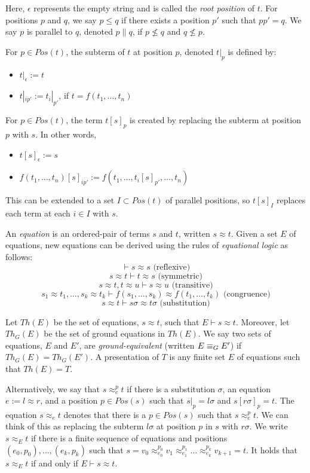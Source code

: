 Here, $\epsilon$ represents the empty string and is called the \emph{root position} of $t$.
For positions $p$ and $q$, we say $p \le q$ if there exists a position $p'$ such that $pp' = q$.  
We say $p$ is parallel to $q$, denoted $p \| q$, if $p \not\le q$ and $q \not\le p$. 

For $p \in Pos(t)$, the subterm of $t$ at position $p$, denoted $t|_p$ is defined by:
\begin{itemize}
\item $t|_\epsilon := t$ 
\item $t|_{ip'} := t_i|_{p'}$, if $t = f(t_1, \dots, t_n)$
\end{itemize}

For $p \in Pos(t)$, the term $t[s]_p$ is created by replacing the subterm at position $p$ with $s$. In other words,
\begin{itemize}
\item $t[s]_\epsilon := s$
\item $f(t_1, \dots, t_n)[s]_{ip'} := f(t_1, \dots, t_i[s]_{p'}, \dots, t_n)$
\end{itemize}

This can be extended to a set $I \subset Pos(t)$ of parallel positions, so $t[s]_I$ replaces each term at each $i \in I$ with $s$.

An \emph{equation} is an ordered-pair of terms $s$ and $t$, written $s \approx t$. 
Given a set $E$ of equations, new equations can be derived using the rules of \emph{equational logic} as follows:
\[ \vdash s \approx s \mbox{ (reflexive)}\]
\[s \approx t \vdash t \approx s \mbox{ (symmetric)}\]
\[s \approx t, t \approx u \vdash s \approx u \mbox{ (transitive)}\]
\[s_1 \approx t_1, \dots, s_k \approx t_k \vdash f(s_1,\dots,s_k)\approx f(t_1,\dots,t_k) \mbox{ (congruence)}\]
\[s \approx t \vdash s\sigma \approx t\sigma \mbox{ (substitution)}\]


Let $Th(E)$ be the set of equations, $s \approx t$, such that $E \vdash s \approx t$. 
Moreover, let $Th_G(E)$ be the set of ground equations in $Th(E)$. 
We say two sets of equations, $E$ and $E'$, are \emph{ground-equivalent}  (written $E \equiv_G E'$) if $Th_G(E) = Th_G(E')$.
A presentation of $T$ is any finite set $E$ of equations such that $Th(E) = T$. 

Alternatively, we say that $s \approx_e^p t$ if there is a substitution $\sigma$, an equation $e := l \approx r$, and a position $p \in Pos(s)$ such that $s|_p = l\sigma$ and $s[r\sigma]_p = t$.
The equation $s \approx_e t$ denotes that there is a $p \in Pos(s)$ such that $s \approx_e^p t$.
We can think of this as replacing the subterm $l\sigma$ at position $p$ in $s$ with $r\sigma$.
We write $s \approx_E t$ if there is a finite sequence of equations and positions $(e_0, p_0), \dots, (e_k, p_k)$ such that $s = v_0 \approx_{e_0}^{p_0} v_1 \approx_{e_1}^{p_1} \dots \approx_{e_k}^{p_k} v_{k+1} = t$.
It holds that $s \approx_E t$ if and only if $E \vdash s \approx t$.

